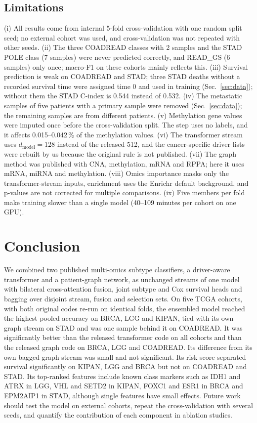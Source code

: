 \documentclass[conference]{IEEEtran}
\begin{document}
\subsection{Limitations}
(i) All results come from internal 5-fold cross-validation with one random split seed; no external cohort was used, and
cross-validation was not repeated with other seeds.
(ii) The three COADREAD classes with 2 samples and the STAD POLE class (7 samples) were never predicted correctly, and
READ\_GS (6 samples) only once; macro-F1 on these cohorts mainly reflects this.
(iii) Survival prediction is weak on COADREAD and STAD; three STAD deaths without a recorded survival time were assigned
time 0 and used in training (Sec.~\ref{sec:data}); without them the STAD C-index is 0.544 instead of 0.532.
(iv) The metastatic samples of five patients with a primary sample were removed (Sec.~\ref{sec:data}); the remaining
samples are from different patients.
(v) Methylation gene values were imputed once before the cross-validation split. The step uses no labels, and it affects
0.015--0.042\,\% of the methylation values.
(vi) The transformer stream uses $d_{\mathrm{model}}=128$ instead of the released 512, and the cancer-specific driver lists
were rebuilt by us because the original rule is not published.
(vii) The graph method was published with CNA, methylation, mRNA and RPPA; here it uses mRNA, miRNA and methylation.
(viii) Omics importance masks only the transformer-stream inputs, enrichment uses the Enrichr default background, and
p-values are not corrected for multiple comparisons.
(ix) Five members per fold make training slower than a single model (40--109 minutes per cohort on one GPU).

\section{Conclusion}
We combined two published multi-omics subtype classifiers, a driver-aware transformer and a patient-graph network, as
unchanged streams of one model with bilateral cross-attention fusion, joint subtype and Cox survival heads and bagging
over disjoint stream, fusion and selection sets. On five TCGA cohorts, with both original codes re-run on identical
folds, the ensembled model reached the highest pooled accuracy on BRCA, LGG and KIPAN, tied with its own graph stream
on STAD and was one sample behind it on COADREAD. It was significantly better than
the released transformer code on all cohorts and than the released graph code on BRCA, LGG and COADREAD. Its
difference from its own bagged graph stream was small and not significant. Its risk score separated survival significantly on KIPAN, LGG and
BRCA but not on COADREAD and STAD. Its top-ranked features include known class markers such as IDH1 and ATRX in LGG,
VHL and SETD2 in KIPAN, FOXC1 and ESR1 in BRCA and EPM2AIP1 in STAD, although single features have small effects.
Future work should test the model on external cohorts, repeat the cross-validation with several seeds, and quantify the
contribution of each component in ablation studies.
\end{document}
